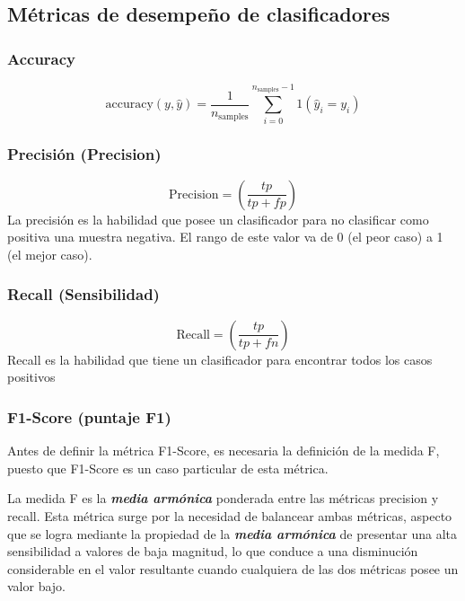 \cite{google2025clasificacion}


\subsection{Métricas de desempeño de clasificadores}

\subsubsection{Accuracy}
\begin{equation}
    \text{accuracy}(y, \hat{y}) = \frac{1}{n_\text{samples}} \sum_{i=0}^{n_\text{samples}-1} 1(\hat{y}_i = y_i)
\end{equation}
\cite{accuracyScoreSkLearn}

\subsubsection{Precisión (Precision)}
\begin{equation}
    \text{Precision} = (\frac{tp}{tp + fp})
\end{equation}
La precisión es la habilidad que posee un clasificador para no clasificar como positiva una muestra negativa.
El rango de este valor va de 0 (el peor caso) a 1 (el mejor caso).
\cite{precisionScoreSkLearn}

\subsubsection{Recall (Sensibilidad)}
\begin{equation}
    \text{Recall} = (\frac{tp}{tp + fn})
\end{equation}
Recall es la habilidad que tiene un clasificador para encontrar todos los casos positivos \cite{recallScoreSkLearn}

\subsubsection{F1-Score (puntaje F1)}
Antes de definir la métrica F1-Score, es necesaria la definición de la medida F, puesto que F1-Score es un caso particular de esta métrica.

La medida F es la \textbf{\textit{media armónica}} ponderada entre las métricas precision y recall. Esta métrica surge por la necesidad de balancear ambas métricas, aspecto que se logra mediante la propiedad de la \textbf{\textit{media armónica}} de presentar una alta sensibilidad a valores de baja magnitud, lo que conduce a una disminución considerable en el valor resultante cuando cualquiera de las dos métricas posee un valor bajo.

